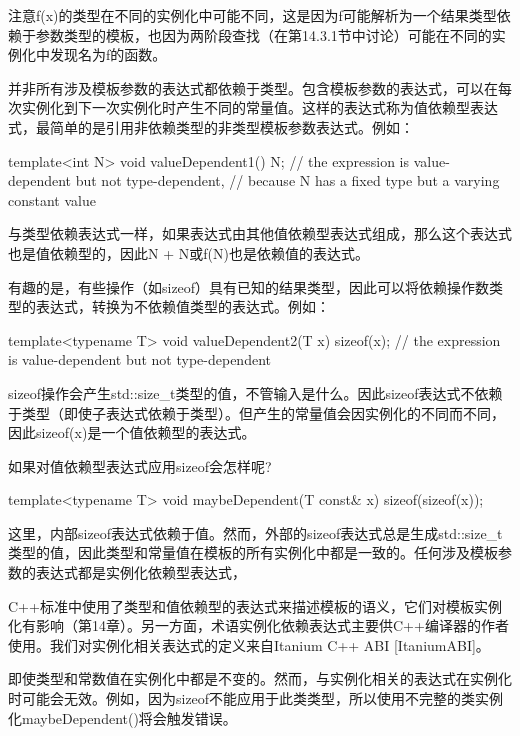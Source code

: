 注意f(x)的类型在不同的实例化中可能不同，这是因为f可能解析为一个结果类型依赖于参数类型的模板，也因为两阶段查找（在第14.3.1节中讨论）可能在不同的实例化中发现名为f的函数。

并非所有涉及模板参数的表达式都依赖于类型。包含模板参数的表达式，可以在每次实例化到下一次实例化时产生不同的常量值。这样的表达式称为值依赖型表达式，最简单的是引用非依赖类型的非类型模板参数表达式。例如：

\begin{cpp}
template<int N> void valueDependent1()
{
	N; // the expression is value-dependent but not type-dependent,
	// because N has a fixed type but a varying constant value
}
\end{cpp}

与类型依赖表达式一样，如果表达式由其他值依赖型表达式组成，那么这个表达式也是值依赖型的，因此N + N或f(N)也是依赖值的表达式。

有趣的是，有些操作（如sizeof）具有已知的结果类型，因此可以将依赖操作数类型的表达式，转换为不依赖值类型的表达式。例如：

\begin{cpp}
template<typename T> void valueDependent2(T x)
{
	sizeof(x); // the expression is value-dependent but not type-dependent
}
\end{cpp}

sizeof操作会产生std::size\_t类型的值，不管输入是什么。因此sizeof表达式不依赖于类型（即使子表达式依赖于类型）。但产生的常量值会因实例化的不同而不同，因此sizeof(x)是一个值依赖型的表达式。

如果对值依赖型表达式应用sizeof会怎样呢?

\begin{cpp}
template<typename T> void maybeDependent(T const& x)
{
	sizeof(sizeof(x));
}
\end{cpp}

这里，内部sizeof表达式依赖于值。然而，外部的sizeof表达式总是生成std::size\_t类型的值，因此类型和常量值在模板的所有实例化中都是一致的。任何涉及模板参数的表达式都是实例化依赖型表达式，

\begin{notice}
C++标准中使用了类型和值依赖型的表达式来描述模板的语义，它们对模板实例化有影响（第14章）。另一方面，术语实例化依赖表达式主要供C++编译器的作者使用。我们对实例化相关表达式的定义来自Itanium C++ ABI [ItaniumABI]。
\end{notice}

即使类型和常数值在实例化中都是不变的。然而，与实例化相关的表达式在实例化时可能会无效。例如，因为sizeof不能应用于此类类型，所以使用不完整的类实例化maybeDependent()将会触发错误。

